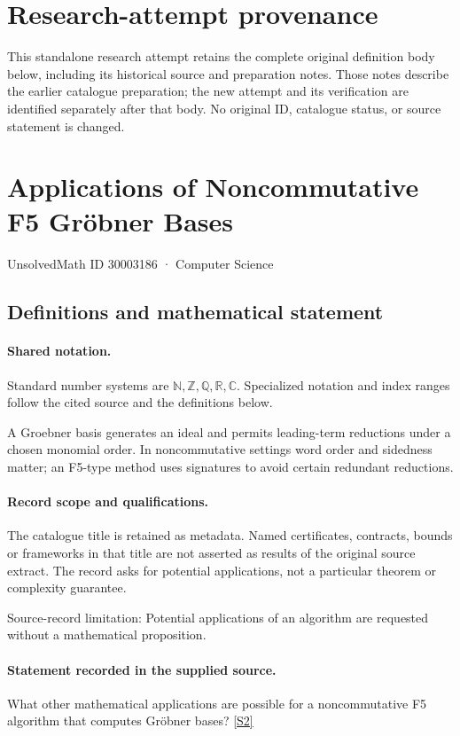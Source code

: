 \documentclass[11pt]{article}
\begin{document}
\section*{Research-attempt provenance}
This standalone research attempt retains the complete original definition body below,
including its historical source and preparation notes. Those notes describe the
earlier catalogue preparation; the new attempt and its verification are identified
separately after that body. No original ID, catalogue status, or source statement is changed.

\section{Applications of Noncommutative F5 Gröbner Bases}\label{30003186}
{\small UnsolvedMath ID 30003186 · Computer Science}
\subsection{Definitions and mathematical statement}

\paragraph{Shared notation.}Standard number systems are $\mathbb N,\mathbb Z,\mathbb Q,\mathbb R,\mathbb C$. Specialized notation and index ranges follow the cited source and the definitions below.


A Groebner basis generates an ideal and permits leading-term reductions under a chosen monomial order. In noncommutative settings word order and sidedness matter; an F5-type method uses signatures to avoid certain redundant reductions.
\paragraph{Record scope and qualifications.}
The catalogue title is retained as metadata. Named certificates, contracts, bounds or frameworks in that title are not asserted as results of the original source extract.
The record asks for potential applications, not a particular theorem or complexity guarantee.

Source-record limitation: Potential applications of an algorithm are requested without a mathematical proposition.
\paragraph{Statement recorded in the supplied source.}
What other mathematical applications are possible for a noncommutative F5 algorithm that computes Gröbner bases? \href{https://doi.org/10.4171/owr/2016/37}{[S2]}
\end{document}
